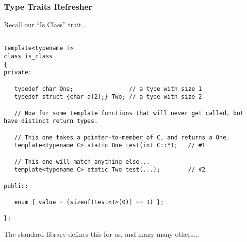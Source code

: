
\begin{frame}[fragile,t]
\frametitle{Type Traits Refresher}
Recall our ``Is Class'' trait...
{\scriptsize\begin{verbatim}

template<typename T>
class is_class
{
private:

   typedef char One;                // a type with size 1
   typedef struct {char a[2];} Two; // a type with size 2

   // Now for some template functions that will never get called, but have distinct return types.

   // This one takes a pointer-to-member of C, and returns a One.
   template<typename C> static One test(int C::*);   // #1

   // This one will match anything else...
   template<typename C> static Two test(...);        // #2

public:

   enum { value = (sizeof(test<T>(0)) == 1) };

};
\end{verbatim}
}

\pause
The  standard library defines this for us, and many many others...

\end{frame}




